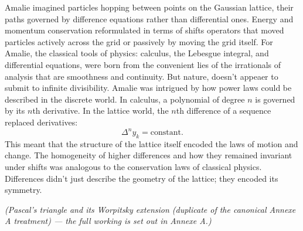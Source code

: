 Amalie imagined particles hopping between points on the Gaussian lattice, their paths governed by difference equations rather than differential ones. Energy and momentum conservation reformulated in terms of shifts operators that moved particles actively across the grid or passively by moving the grid itself. For Amalie, the classical tools of physics: calculus, the Lebesgue integral, and differential equations, were born from the convenient lies of the irrationals of analysis that are smoothness and continuity. But nature, doesn’t appeaer to submit to infinite divisibility. Amalie was intrigued by how power laws could be described in the discrete world. In calculus, a polynomial of degree \(n\) is governed by its \(n\)th derivative. In the lattice world, the \(n\)th difference of a sequence replaced derivatives:
\[
\Delta^n y_k = \text{constant}.
\]
This meant that the structure of the lattice itself encoded the laws of motion and change. The homogeneity of higher differences and how they remained invariant under shifts was analogous to the conservation laws of classical physics. Differences didn’t just describe the geometry of the lattice; they encoded its symmetry.

\textit{(Pascal's triangle and its Worpitsky extension (duplicate of the canonical Annexe A treatment) --- the full working is set out in Annexe A.)}

